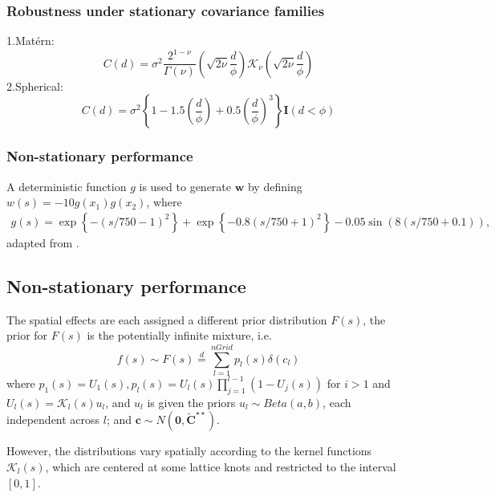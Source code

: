 \documentclass[
12pt, %
a4paper, %
oneside, %
headinclude,footinclude, %
BCOR5mm, %
]{scrartcl}
\begin{document}
\subsubsection{ Robustness under stationary covariance families}
1.Matérn:
$$C(d) = \sigma^2 \frac{2^{1 - \nu}}{\Gamma(\nu)}\left(\sqrt{2\nu}\frac{d}{\phi}\right)\mathcal{K}_{\nu}\left(\sqrt{2\nu}\frac{d}{\phi}\right)$$
2.Spherical:
$$C(d) = \sigma^2\left\{1 - 1.5\left(\frac{d}{\phi}\right) + 0.5\left(\frac{d}{\phi}\right)^3\right\}\mathbf{I}(d < \phi)$$


\subsubsection{Non-stationary performance}
A deterministic function $g$ is used to generate $\boldsymbol{w}$ by defining $w(s) = -10g(x_1)g(x_2)$, where 
\begin{equation}
\begin{aligned}
  g(s) = \exp\left\{-\left(s/750 - 1\right)^2\right\} + \exp\left\{-0.8\left(s/750 + 1\right)^2\right\} - 0.05\sin\left(8(s/750 + 0.1)\right),
\end{aligned} \label{DP1}
\end{equation}
adapted from \citep{guhaniyogi2017divide}.


\subsection{Non-stationary performance}
The spatial effects are each assigned a different prior distribution $F(s)$, the prior for $F(s)$ is the potentially infinite mixture, i.e. 
$$f(s) \sim F(s) \overset{d}{=} \sum_{l = 1}^{nGrid}p_l(s)\delta(c_l)$$ 
where $p_1(s) = U_1(s), p_l(s) = U_l(s)\prod_{j = 1}^{l - 1}\left(1 - U_j(s)\right)$ for $i >1$ and $U_l(s) = \mathcal{K}_l(s)u_l$, and $u_l$ is given the priors $u_l \sim Beta(a, b)$, each independent across $l$; and $\boldsymbol{c} \sim N(\boldsymbol{0}, \boldsymbol{\tilde{C}}^{\star\star})$.

 However, the distributions vary spatially according to the kernel functions $\mathcal{K}_l(s)$, which are  centered at some lattice knots and restricted to the interval $[0,1]$.

%

\end{document}

